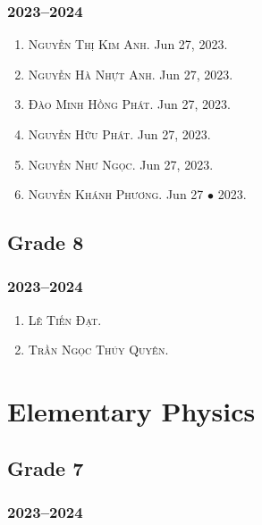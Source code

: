 \documentclass{article}
\begin{document}
\subsubsection{2023--2024}

\begin{enumerate}
	\item \textsc{Nguyễn Thị Kim Anh.} {\sf[In]} Jun 27, 2023.
	\item \textsc{Nguyễn Hà Nhựt Anh.} {\sf[In]} Jun 27, 2023.
	\item \textsc{Đào Minh Hồng Phát.} {\sf[In]} Jun 27, 2023.
	\item \textsc{Nguyễn Hữu Phát.} {\sf[In]} Jun 27, 2023.
	\item \textsc{Nguyễn Như Ngọc.} {\sf[In]} Jun 27, 2023.
	\item \textsc{Nguyễn Khánh Phương.} {\sf[In]} Jun 27 $\bullet$ 2023.
\end{enumerate}


\subsection{Grade 8}

\subsubsection{2023--2024}

\begin{enumerate}
	\item \textsc{Lê Tiến Đạt.}
	\item \textsc{Trần Ngọc Thúy Quyên.}
\end{enumerate}


\section{Elementary Physics}

\subsection{Grade 7}

\subsubsection{2023--2024}
\end{document}
